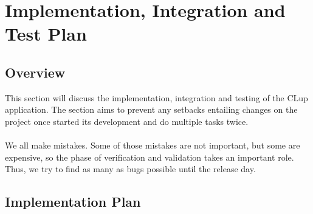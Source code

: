 \section{Implementation, Integration and Test Plan}
\subsection{Overview}
\vspace{0.5cm}
This section will discuss the implementation, integration and testing of the CLup application. The section aims to prevent any setbacks entailing changes on the project once started its development and do multiple tasks twice.\\
\\
We all make mistakes. Some of those mistakes are not important, but some are expensive, so the phase of verification and validation takes an important role. Thus, we try to find as many as bugs possible until the release day.

\subsection{Implementation Plan}
\vspace{0.5cm}

